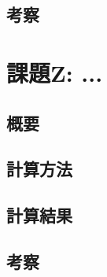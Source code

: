 \documentclass[uplatex,11pt]{jsarticle}
\begin{document}
\subsection{考察}

\section{課題Z: ...}

\subsection{概要}

\subsection{計算方法}

\subsection{計算結果}

\subsection{考察}
\end{document}
